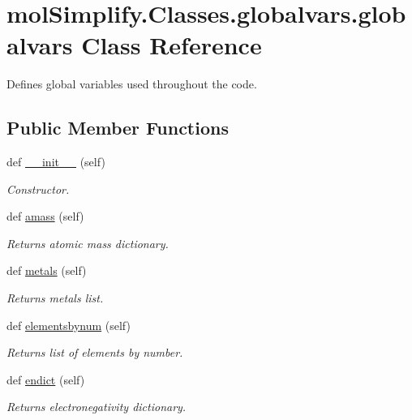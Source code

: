 \hypertarget{classmolSimplify_1_1Classes_1_1globalvars_1_1globalvars}{}\section{mol\+Simplify.\+Classes.\+globalvars.\+globalvars Class Reference}
\label{classmolSimplify_1_1Classes_1_1globalvars_1_1globalvars}


Defines global variables used throughout the code.  


\subsection*{Public Member Functions}
\begin{DoxyCompactItemize}
\item 
def \hyperlink{classmolSimplify_1_1Classes_1_1globalvars_1_1globalvars_ab32a1ccd10b2f28a8d13b60b9a394d04}{\+\_\+\+\_\+init\+\_\+\+\_\+} (self)
\begin{DoxyCompactList}\small\item\em Constructor. \end{DoxyCompactList}\item 
def \hyperlink{classmolSimplify_1_1Classes_1_1globalvars_1_1globalvars_a3445aa2f86c723616f75e37c9fb8e648}{amass} (self)
\begin{DoxyCompactList}\small\item\em Returns atomic mass dictionary. \end{DoxyCompactList}\item 
def \hyperlink{classmolSimplify_1_1Classes_1_1globalvars_1_1globalvars_a673cd53d924bdfef605d520b8c2ab3a8}{metals} (self)
\begin{DoxyCompactList}\small\item\em Returns metals list. \end{DoxyCompactList}\item 
def \hyperlink{classmolSimplify_1_1Classes_1_1globalvars_1_1globalvars_a056773e84caa30b9ef6bb482f7ebd68d}{elementsbynum} (self)
\begin{DoxyCompactList}\small\item\em Returns list of elements by number. \end{DoxyCompactList}\item 
def \hyperlink{classmolSimplify_1_1Classes_1_1globalvars_1_1globalvars_a624f761230e8d21715ab233d96991398}{endict} (self)
\begin{DoxyCompactList}\small\item\em Returns electronegativity dictionary. \end{DoxyCompactList}\item 

\end{DoxyCompactItemize}
